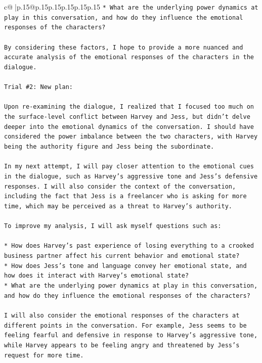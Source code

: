 \documentclass{article}
\begin{document}
{\begin{supertabular}{c@{$\;$}|p{.15\linewidth}@{}p{.15\linewidth}p{.15\linewidth}p{.15\linewidth}p{.15\linewidth}p{.15\linewidth}}
{{{\texttt{* What are the underlying power dynamics at play in this conversation, and how do they influence the emotional responses of the characters?} \\
\\ 
\texttt{By considering these factors, I hope to provide a more nuanced and accurate analysis of the emotional responses of the characters in the dialogue.} \\
\\ 
\texttt{Trial \#2: New plan: } \\
\\ 
\texttt{Upon re{-}examining the dialogue, I realized that I focused too much on the surface{-}level conflict between Harvey and Jess, but didn't delve deeper into the emotional dynamics of the conversation. I should have considered the power imbalance between the two characters, with Harvey being the authority figure and Jess being the subordinate. } \\
\\ 
\texttt{In my next attempt, I will pay closer attention to the emotional cues in the dialogue, such as Harvey's aggressive tone and Jess's defensive responses. I will also consider the context of the conversation, including the fact that Jess is a freelancer who is asking for more time, which may be perceived as a threat to Harvey's authority.} \\
\\ 
\texttt{To improve my analysis, I will ask myself questions such as:} \\
\\ 
\texttt{* How does Harvey's past experience of losing everything to a crooked business partner affect his current behavior and emotional state?} \\
\texttt{* How does Jess's tone and language convey her emotional state, and how does it interact with Harvey's emotional state?} \\
\texttt{* What are the underlying power dynamics at play in this conversation, and how do they influence the emotional responses of the characters?} \\
\\ 
\texttt{I will also consider the emotional responses of the characters at different points in the conversation. For example, Jess seems to be feeling fearful and defensive in response to Harvey's aggressive tone, while Harvey appears to be feeling angry and threatened by Jess's request for more time.} \\
\\ 
}}}
\end{supertabular}}
\end{document}
